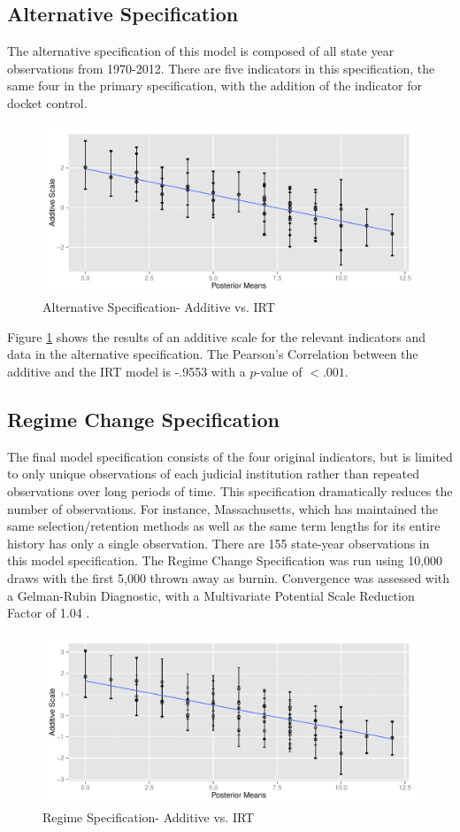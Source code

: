 \documentclass[JohnsonMADraft3]{subfiles}
\begin{document}
\subsection{Alternative Specification}
The alternative specification of this model is composed of all state year observations from 1970-2012. There are five indicators in this specification, the same four in the primary specification, with the addition of the indicator for docket control.  

\begin{figure}
\centering
\caption{Alternative Specification- Additive vs. IRT}
\label{fig:fiveind_additive_ggplot}
\includegraphics[width=0.7\linewidth]{graphics/fiveind/fiveind_additive_ggplot}
\end{figure}

Figure \ref{fig:fiveind_additive_ggplot} shows the results of an additive scale for the relevant indicators and data in the alternative specification.  The Pearson's Correlation between the additive and the IRT model is -.9553 with a $p$-value of $<.001$.

\subsection{Regime Change Specification}
The final model specification consists of the four original indicators, but is limited to only unique observations of each judicial institution rather than repeated observations over long periods of time.  This specification dramatically reduces the number of observations.  For instance, Massachusetts, which has maintained the same selection/retention methods as well as the same term lengths for its entire history has only a single observation.  There are 155 state-year observations in this model specification.  The Regime Change Specification was run using 10,000 draws with the first 5,000 thrown away as burnin.  Convergence was assessed with a Gelman-Rubin Diagnostic, with a Multivariate Potential Scale Reduction Factor of 1.04 \citep{Gelman1992}.  

\begin{figure}
\centering
\caption{Regime Specification- Additive vs. IRT}
\label{fig:regime_additive_ggplot.pdf}
\includegraphics[width=0.7\linewidth]{graphics/regime/regime_additive_ggplot}
\end{figure}
\end{document}
